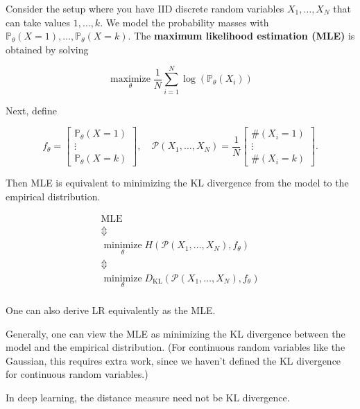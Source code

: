\begin{concept}
    Consider the setup where you have IID discrete random variables $X_{1}, \ldots, X_{N}$ that can take values $1, \ldots, k$. We model the probability masses with $\mathbb{P}_{\theta}(X=1), \ldots, \mathbb{P}_{\theta}(X=k)$. The \textbf{maximum likelihood estimation (MLE)} is obtained by solving

    $$
    \underset{\theta}{\operatorname{maximize}} \frac{1}{N} \sum_{i=1}^{N} \log \left(\mathbb{P}_{\theta}\left(X_{i}\right)\right)
    $$

    Next, define

    $$
    f_{\theta}=\left[\begin{array}{c}
    \mathbb{P}_{\theta}(X=1) \\
    \vdots \\
    \mathbb{P}_{\theta}(X=k)
    \end{array}\right], \quad \mathcal{P}\left(X_{1}, \ldots, X_{N}\right)=\frac{1}{N}\left[\begin{array}{c}
    \#\left(X_{i}=1\right) \\
    \vdots \\
    \#\left(X_{i}=k\right)
    \end{array}\right] .
    $$

    Then MLE is equivalent to minimizing the KL divergence from the model to the empirical distribution.

    $$
    \begin{gathered}
    \text{MLE} \\
    \mathbb{\Updownarrow} \\
    \underset{\theta}{\operatorname{minimize}} H \left( \mathcal{P}\left(X_{1}, \ldots, X_{N}\right), f_{\theta}\right) \\
    \mathbb{\Updownarrow} \\
    \underset{\theta}{\operatorname{minimize}} D_{\mathrm{KL}} \left( \mathcal{P}\left(X_{1}, \ldots, X_{N}\right), f_{\theta}\right) \\
    \end{gathered}
    $$

    One can also derive LR equivalently as the MLE.

    Generally, one can view the MLE as minimizing the KL divergence between the model and the empirical distribution. (For continuous random variables like the Gaussian, this requires extra work, since we haven't defined the KL divergence for continuous random variables.)

    In deep learning, the distance measure need not be KL divergence.
\end{concept}

